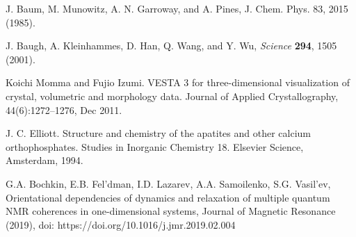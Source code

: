 \begin{thebibliography}{}
 J. Baum, M. Munowitz, A. N. Garroway, and A. Pines, J. Chem. Phys. 83, 2015 (1985).


J. Baugh, A. Kleinhammes, D. Han, Q. Wang, and Y. Wu, \textit{Science} \textbf{294}, 1505 (2001).



 Koichi Momma and Fujio Izumi. VESTA 3 for three-dimensional visualization of crystal, volumetric and morphology data. Journal of Applied Crystallography, 44(6):1272–1276, Dec 2011.

 J. C. Elliott. Structure and chemistry of the apatites and other calcium orthophosphates. Studies in Inorganic Chemistry 18. Elsevier Science, Amsterdam, 1994.


 G.A. Bochkin, E.B. Fel’dman, I.D. Lazarev, A.A. Samoilenko, S.G. Vasil’ev, Orientational dependencies of dynamics and relaxation of multiple quantum NMR coherences in one-dimensional systems, Journal of Magnetic Resonance (2019), doi: https://doi.org/10.1016/j.jmr.2019.02.004


\end{thebibliography}
